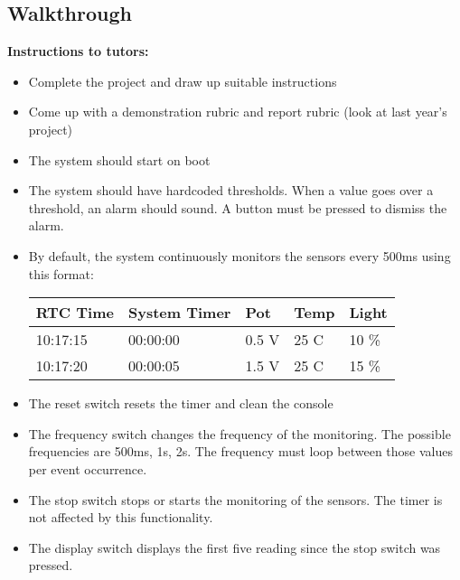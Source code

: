 \subsection{Walkthrough}
\textbf{Instructions to tutors:}
\begin{itemize}
    \item Complete the project and draw up suitable instructions
    \item Come up with a demonstration rubric and report rubric (look at last year's project)
    \item The system should start on boot
    \item The system should have hardcoded thresholds. When a value goes over a threshold, an alarm should sound. A button must be pressed to dismiss the alarm.
    \item By default, the system continuously monitors the sensors every 500ms using this format:
    \begin{table}[H]
    \centering
    \begin{tabular}{|l|l|l|l|l|}
    \hline
    RTC Time & System Timer & Pot   & Temp & Light \\ \hline
    10:17:15 & 00:00:00     & 0.5 V & 25 C & 10 \% \\ \hline
    10:17:20 & 00:00:05     & 1.5 V & 25 C & 15 \% \\ \hline
    \end{tabular}
    \end{table}
    \item The reset switch resets the timer and clean the console
    \item The frequency switch changes the frequency of the monitoring. The possible frequencies are 500ms, 1s, 2s. The frequency must loop between those values per event occurrence.
    \item The stop switch stops or starts the monitoring of the sensors. The timer is not affected by this functionality.
    \item The display switch displays the first five reading since the stop switch was pressed.
\end{itemize}
